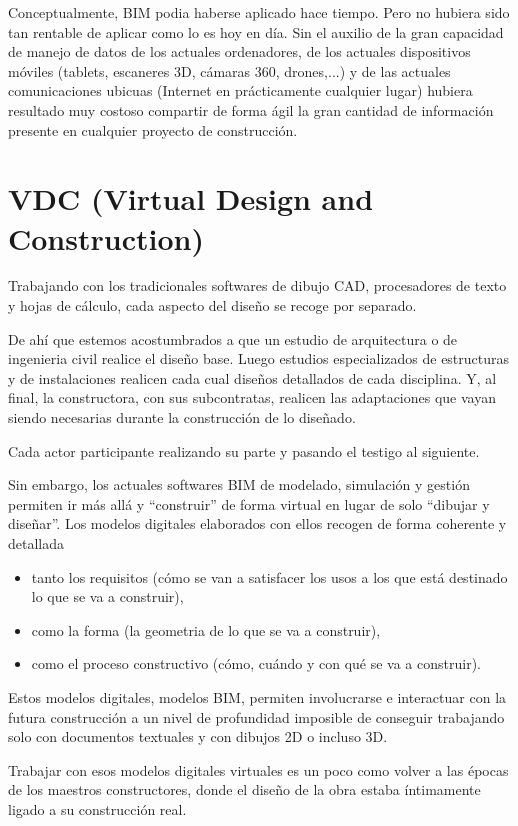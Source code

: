 \documentclass[spanish,12pt,a4paper,final,oneside]{book}
\begin{document}
Conceptualmente, BIM podia haberse aplicado hace tiempo. Pero no hubiera sido tan rentable de aplicar como lo es hoy en día. Sin el auxilio de la gran capacidad de manejo de datos de los actuales ordenadores, de los actuales dispositivos móviles (tablets, escaneres 3D, cámaras 360, drones,...) y de las actuales comunicaciones ubicuas (Internet en prácticamente cualquier lugar) hubiera resultado muy costoso compartir de forma ágil la gran cantidad de información presente en cualquier proyecto de construcción. 

\section{VDC (Virtual Design and Construction)}
 
Trabajando con los tradicionales softwares de dibujo CAD, procesadores de texto y hojas de cálculo, cada aspecto del diseño se recoge por separado.

De ahí que estemos acostumbrados a que un estudio de arquitectura o de ingenieria civil realice el diseño base. Luego estudios especializados de estructuras y de instalaciones realicen cada cual diseños detallados de cada disciplina. Y, al final, la constructora, con sus subcontratas, realicen las adaptaciones que vayan siendo necesarias durante la construcción de lo diseñado.

Cada actor participante realizando su parte y pasando el testigo al siguiente.

Sin embargo, los actuales softwares BIM de modelado, simulación y gestión permiten ir más allá y ``construir'' de forma virtual en lugar de solo ``dibujar y diseñar''. Los modelos digitales elaborados con ellos recogen de forma coherente y detallada
\begin{itemize}
\item tanto los requisitos (cómo se van a satisfacer los usos a los que está destinado lo que se va a construir), 
\item como la forma (la geometria de lo que se va a construir), 
\item como el proceso constructivo (cómo, cuándo y con qué se va a construir).
\end{itemize}

Estos modelos digitales, modelos BIM, permiten involucrarse e interactuar con la futura construcción a un nivel de profundidad imposible de conseguir trabajando solo con documentos textuales y con dibujos 2D o incluso 3D.

Trabajar con esos modelos digitales virtuales es un poco como volver a las épocas de los maestros constructores, donde el diseño de la obra estaba íntimamente ligado a su construcción real.
\end{document}
